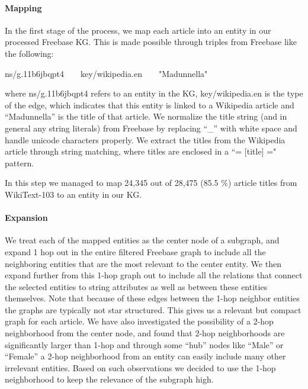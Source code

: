 \documentclass[11pt]{article}
\begin{document}
\paragraph{Mapping}  In the first stage of the process, we map each article into an entity in our processed Freebase KG.  This is made possible through triples from Freebase like the following:
\begin{tcolorbox}
{\small
ns/g.11b6jbqpt4~~~~key/wikipedia.en~~~~"Madunnella"}
\end{tcolorbox}
\noindent
where ns/g.11b6jbqpt4 refers to an entity in the KG, key/wikipedia.en is the type of the edge, which indicates that this entity is linked to a Wikipedia article and ``Madunnella'' is the title of that article.  We normalize the title string (and in general any string literals) from Freebase by replacing ``\_'' with white space and handle unicode characters properly.  We extract the titles from the Wikipedia article through string matching, where titles are enclosed in a ``= [title] =" pattern.

In this step we managed to map 24,345 out of 28,475 (85.5 \%) article titles from WikiText-103 to an entity in our KG.

\paragraph{Expansion}  We treat each of the mapped entities as the center node of a subgraph, and expand 1 hop out in the entire filtered Freebase graph to include all the neighboring entities that are the most relevant to the center entity.  We then expand further from this 1-hop graph out to include all the relations that connect the selected entities to string attributes as well as between these entities themselves.  Note that because of these edges between the 1-hop neighbor entities the graphs are typically not star structured. This gives us a relevant but compact graph for each article.  We have also investigated the possibility of a 2-hop neighborhood from the center node, and found that 2-hop neighborhoods are significantly larger than 1-hop and through some ``hub'' nodes like ``Male'' or ``Female'' a 2-hop neighborhood from an entity can easily include many other irrelevant entities.  Based on such observations we decided to use the 1-hop neighborhood to keep the relevance of the subgraph high.
\end{document}
